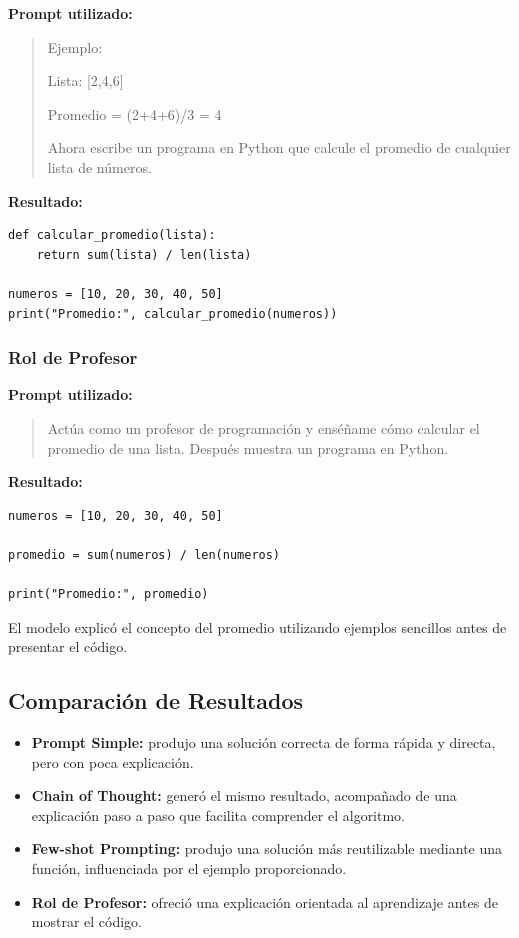 \documentclass[12pt,a4paper]{article}
\begin{document}
\textbf{Prompt utilizado:}

\begin{quote}
Ejemplo:

Lista: [2,4,6]

Promedio = (2+4+6)/3 = 4

Ahora escribe un programa en Python que calcule el promedio de cualquier lista de números.
\end{quote}

\textbf{Resultado:}

\begin{verbatim}
def calcular_promedio(lista):
    return sum(lista) / len(lista)

numeros = [10, 20, 30, 40, 50]
print("Promedio:", calcular_promedio(numeros))
\end{verbatim}

\subsubsection{Rol de Profesor}

\textbf{Prompt utilizado:}

\begin{quote}
Actúa como un profesor de programación y enséñame cómo calcular el promedio de una lista. Después muestra un programa en Python.
\end{quote}

\textbf{Resultado:}

\begin{verbatim}
numeros = [10, 20, 30, 40, 50]

promedio = sum(numeros) / len(numeros)

print("Promedio:", promedio)
\end{verbatim}

El modelo explicó el concepto del promedio utilizando ejemplos sencillos antes de presentar el código.

\subsection{Comparación de Resultados}

\begin{itemize}
    \item \textbf{Prompt Simple:} produjo una solución correcta de forma rápida y directa, pero con poca explicación.
    
    \item \textbf{Chain of Thought:} generó el mismo resultado, acompañado de una explicación paso a paso que facilita comprender el algoritmo.
    
    \item \textbf{Few-shot Prompting:} produjo una solución más reutilizable mediante una función, influenciada por el ejemplo proporcionado.
    
    \item \textbf{Rol de Profesor:} ofreció una explicación orientada al aprendizaje antes de mostrar el código.
\end{itemize}
\end{document}

